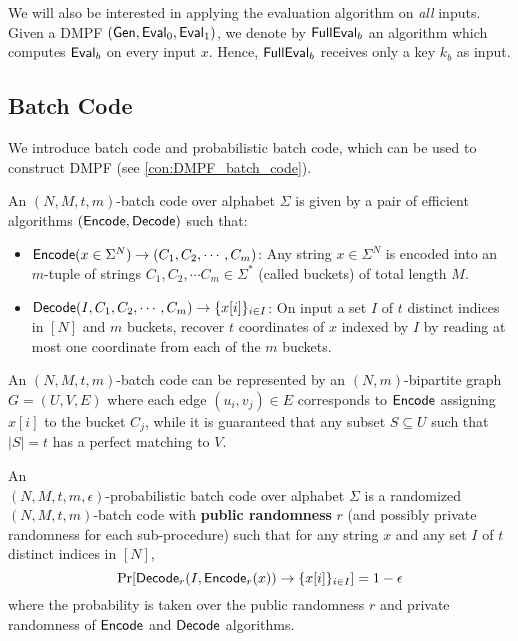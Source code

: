  We will also be interested in applying the evaluation algorithm on \emph{all} inputs. Given a DMPF $({\sf Gen},{\sf Eval}_0,{\sf Eval}_1)$, we denote by ${\sf FullEval}_b$ an algorithm which computes ${\sf Eval}_b$ on every input $x$. Hence, ${\sf FullEval}_b$ receives only a key $k_b$ as input.



\subsection{Batch Code}
We introduce batch code and probabilistic batch code, which can be used to construct DMPF (see \cref{con:DMPF_batch_code}). 
\begin{definition}
  An $(N,M,t,m)$-batch code over alphabet $\Sigma$ is given by a pair of efficient algorithms $({\sf Encode},{\sf Decode})$ such that:
  \begin{itemize}
    \item ${\sf Encode}(x\in\Sigma^N)\rightarrow (C_1,C_2,\cdots,C_m)$: Any string $x\in\Sigma^N$ is encoded into an $m$-tuple of strings $C_1,C_2,\cdots C_m\in\Sigma^*$ (called buckets) of total length $M$.
    \item ${\sf Decode}(I,C_1,C_2,\cdots,C_m)\rightarrow \{x[i]\}_{i\in I}$: On input a set $I$ of $t$ distinct indices in $[N]$ and $m$ buckets, recover $t$ coordinates of $x$ indexed by $I$ by reading at most one coordinate from each of the $m$ buckets. 
  \end{itemize}
\end{definition}

An $(N,M,t,m)$-batch code can be represented by an $(N,m)$-bipartite graph $G=(U,V,E)$ where each edge $(u_i,v_j)\in E$ corresponds to ${\sf Encode}$ assigning $x[i]$ to the bucket $C_j$, while it is guaranteed that any subset $S\subseteq U$ such that $|S|=t$ has a perfect matching to $V$. 

\begin{definition}
An\\ $(N,M,t,m,\epsilon)$-probabilistic batch code over alphabet $\Sigma$ is a randomized $(N,M,t,m)$-batch code with \textbf{public randomness} $r$ (and possibly private randomness for each sub-procedure) such that for any string $x$ and any set $I$ of $t$ distinct indices in $[N]$, 
\[
  \Pr[{\sf Decode}_r(I,{\sf Encode}_r(x))\rightarrow \{x[i]\}_{i\in I}] = 1-\epsilon
\]
where the probability is taken over the public randomness $r$ and private randomness of ${\sf Encode}$ and ${\sf Decode}$ algorithms. 
\end{definition}

